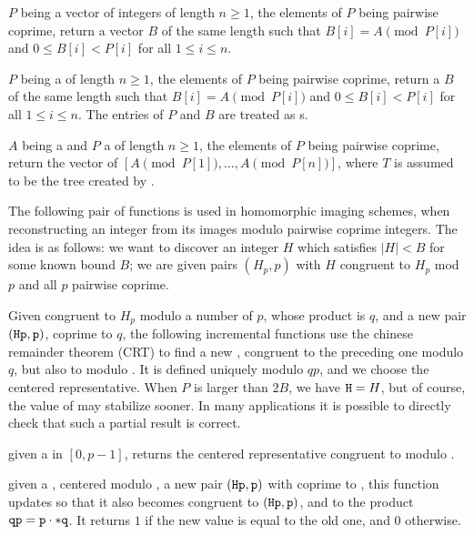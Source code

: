 $P$ being a vector of integers of length $n\ge 1$, the elements of $P$ being
pairwise coprime, return a vector $B$ of the same length such that
$B[i]=A\pmod{P[i]}$ and $0\leq B[i] < P[i]$ for all $1\leq i\leq n$.

$P$ being a  of length $n\ge 1$, the elements of $P$ being
pairwise coprime, return a  $B$ of the same length such that
$B[i]=A\pmod{P[i]}$ and $0\leq B[i] < P[i]$ for all $1\leq i\leq n$.
The entries of $P$ and $B$ are treated as s.

 $A$ being a 
and $P$ a  of length $n\ge 1$, the elements of $P$ being
pairwise coprime, return the vector of 
$[A \pmod{P[1]},\ldots,A \pmod{P[n]}]$,
where $T$ is assumed to be the tree created by .

\medskip

The following pair of functions is used in homomorphic imaging schemes,
when reconstructing an integer from its images modulo pairwise coprime
integers. The idea is as follows: we want to discover an integer $H$ which
satisfies $|H| < B$ for some known bound $B$; we are given pairs $(H_p, p)$
with $H$ congruent to $H_p$ mod $p$ and all $p$ pairwise coprime.

Given  congruent to $H_p$ modulo a number of $p$, whose product is
$q$, and a new pair $({\tt Hp}, {\tt p})$,  coprime to $q$, the
following incremental functions use the chinese remainder theorem (CRT) to
find a new , congruent to the preceding one modulo $q$, but also to
 modulo . It is defined uniquely modulo $qp$, and we choose
the centered representative. When $P$ is larger than $2B$, we have ${\tt H} =
H$, but of course, the value of  may stabilize sooner. In many
applications it is possible to directly check that such a partial result is
correct.

 given a   in
$[0, p-1]$, returns the centered representative  congruent to 
modulo .

given a  , centered modulo , a new pair $({\tt Hp},
{\tt p})$ with  coprime to , this function updates  so
that it also becomes congruent to $({\tt Hp}, {\tt p})$, and  to the
product${\tt qp} = {\tt p} \cdot {\tt *q}$. It returns $1$ if the new value
is equal to the old one, and $0$ otherwise.

